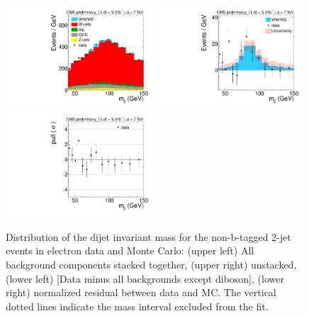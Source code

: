 \begin{figure}[h!]
  {\centering
    \includegraphics[width=0.49\textwidth]{figs/mjjfit_2jetsample/Wjj_Diboson_Electron_2jets_Stacked.pdf}
    \includegraphics[width=0.49\textwidth]{figs/mjjfit_2jetsample/Wjj_Diboson_Electron_2jets_Subtracted.pdf}
    \includegraphics[width=0.49\textwidth]{figs/mjjfit_2jetsample/Wjj_Diboson_Electron_2jets_Pull.pdf}
    \caption{Distribution of the dijet invariant mass for the non-b-tagged 2-jet events in electron data and Monte Carlo: 
      (upper left) All background components stacked together, 
      (upper right) unstacked, (lower left) [Data minus all backgrounds except diboson],  
      (lower right) normalized residual between data and MC. The vertical dotted lines
      indicate the mass interval excluded from the fit.}
    \label{fig:mjj_2jet_el}}
\end{figure}
